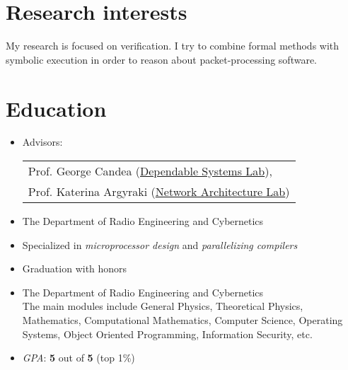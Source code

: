 \documentclass[letterpaper]{resume}
\begin{document}
\author{Arseniy Yurievich Zaostrovnykh}
\date{\today}
\maketitle

\section{Research interests}
My research is focused on verification. I try to combine formal methods with symbolic execution in order to reason about packet-processing software.

\section{Education}

\begin{itemize}
  \item Advisors: \begin{tabular}{l}
    Prof. George Candea (\href{http://dslab.epfl.ch}{Dependable Systems Lab}),\\
    Prof. Katerina Argyraki (\href{http://nal.epfl.ch}{Network Architecture Lab})
  \end{tabular}
\end{itemize}

\begin{itemize}
    \item The Department of Radio Engineering and Cybernetics
    \item Specialized in \emph{microprocessor design} and \emph{parallelizing compilers}
    \item Graduation with honors
\end{itemize}

\begin{itemize}
    \item The Department of Radio Engineering and Cybernetics\\ The main modules include General Physics,
      Theoretical Physics, Mathematics, Computational Mathematics,
      Computer Science, Operating Systems, Object Oriented Programming, Information Security, etc.
    \item \emph{GPA}: {\bf 5%
    } out of {\bf 5} (top 1\%)
\end{itemize}
\end{document}
